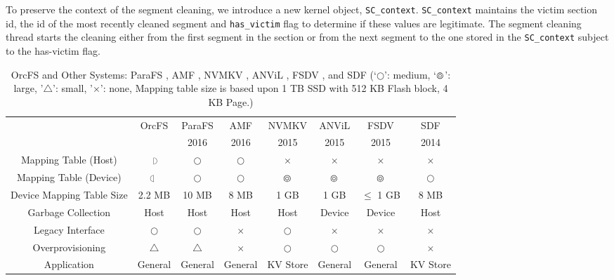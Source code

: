 \documentclass[prodmode,acmtecs]{acmsmall}
\begin{document}
To preserve the context of the segment cleaning, we introduce a new
kernel object, \texttt{SC\_context}. \texttt{SC\_context} maintains
the victim section id, the id of the most recently cleaned segment and
\texttt{has\_victim} flag to determine if these values are
legitimate. The segment cleaning thread starts the cleaning either from
the first segment in the section or from the next segment to the one
stored in the \texttt{SC\_context} subject to the has-victim flag.



\begin{table}[t]
\fontsize{7.5}{10}\selectfont
  \begin{center}
  \begin{tabular}{|c|c|c|c|c|c|c|c|} \hline
  						& OrcFS 			& ParaFS 	& AMF  & NVMKV & ANViL & FSDV & SDF 	\\
  						& 	 			& 2016					& 2016 		& 2015		& 2015 			& 2015		  	& 2014			\\ \hline \hline
  Mapping Table (Host) 	& $\Rightcircle$ 	& $\Circle$				& $\Circle$ 	& $\times$ 	& $\times$ 		& $\times$ 		& $\times$ 		\\ \hline
  Mapping Table (Device) 	& $\Leftcircle$ 	& $\Circle$				& $\Circle$	& $\varocircle$ 	& $\varocircle$ 		& $\varocircle$ 		& $\Circle$ 		\\ \hline
  Device Mapping Table Size			& 2.2 MB	 		& 10 MB					& 8 MB 		& 1 GB 		& 1 GB 			& $\leq$ 1 GB 	& 8 MB			\\ \hline
  Garbage Collection		& Host 			& Host 					& Host 		& Host 		& Device 			& Device 			& Host 			\\ \hline
  Legacy Interface  		& $\Circle$ 		& $\Circle$				& $\times$ 	& $\Circle$ 	& $\times$  		& $\times$ 		& $\times$ 		\\ \hline
  Overprovisioning 		& $\triangle$ 	& $\triangle$ 			& $\times$ 	& $\Circle$ 	& $\Circle$ 		& $\Circle$ 		& $\times$ 		\\ \hline
  Application 			& General 		& General					& General 	& KV Store 	& General 		& General 		& KV Store 		\\ \hline
  \end{tabular}
  \end{center}
    \caption{OrcFS and Other Systems: ParaFS \protect\cite{zhang2016parafs}, AMF \protect\cite{lee2016application}, NVMKV \protect\cite{nvmkv}, ANViL \protect\cite{anvil}, FSDV \protect\cite{zhangremoving}, and SDF  \protect\cite{sdf} (`$\Circle$': medium,
  `$\varocircle$': large, '$\triangle$': small, '$\times$': none,
  Mapping table size is based upon 1 TB SSD with 512 KB Flash block, 4
  KB Page.)} 
  \label{tab:compare_usl}
\end{table}
\end{document}
